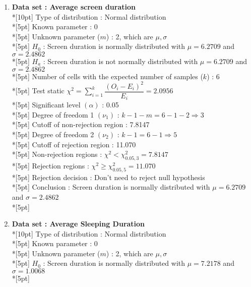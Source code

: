 \begin{enumerate}
    \item \textbf{Data set : Average screen duration}\\*[10pt]
        Type of distribution : Normal distribution\\*[5pt]
        Known parameter : 0\\*[5pt]
        Unknown parameter ($m$) : 2, which are \(\mu, \sigma\)\\*[5pt]
        $H_0$ : Screen duration is normally distributed with $\mu=6.2709$ and $\sigma=2.4862$\\*[5pt]
        $H_a$ : Screen duration is not normally distributed with $\mu=6.2709$ and $\sigma=2.4862$\\*[5pt]
        Number of cells with the expected number of samples ($k$) : 6\\*[5pt]
        Test static \(\chi^2=\displaystyle\sum\limits^k_{i=1}\dfrac{\left(O_i-E_i\right)^2}{E_i} = 2.0956\)\\*[5pt]
        Significant level \(\left(\alpha\right)\) : 0.05\\*[5pt]
        Degree of freedom 1 \((\nu_1)\) : $k - 1 - m = 6 - 1 - 2 \Rightarrow 3$\\*[5pt]
        Cutoff of non-rejection region : 7.8147\\*[5pt]
        Degree of freedom 2 \((\nu_2)\) : $k - 1 = 6 - 1 \Rightarrow 5$\\*[5pt]
        Cutoff of rejection region : 11.070\\*[5pt]
        Non-rejection regions : \(\chi^2 < \chi^2_{0.05, 3}=7.8147\)\\*[5pt]
        Rejection regions : \(\chi^2 \geq \chi^2_{0.05, 5}=11.070\)\\*[5pt]
        Rejection decision : Don't need to reject null hypothesis\\*[5pt]
        Conclusion : Screen duration is normally distributed with $\mu=6.2709$ and $\sigma=2.4862$\\*[5pt]
    \item \textbf{Data set : Average Sleeping Duration}\\*[10pt]
        Type of distribution : Normal distribution\\*[5pt]
        Known parameter : 0\\*[5pt]
        Unknown parameter ($m$) : 2, which are \(\mu, \sigma\)\\*[5pt]
        $H_0$ : Screen duration is normally distributed with $\mu=7.2178$ and $\sigma=1.0068$\\*[5pt]

\end{enumerate}
